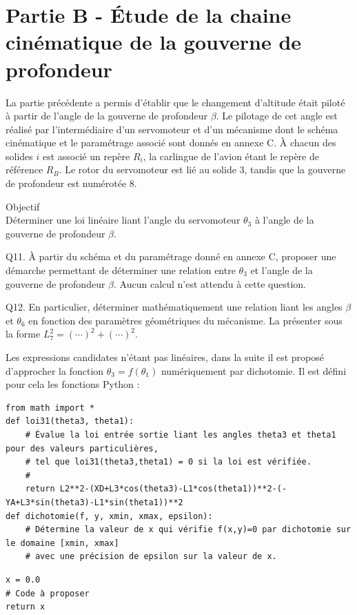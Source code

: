 \documentclass[10pt]{article}
\begin{document}
\section*{Partie B - Étude de la chaine cinématique de la gouverne de profondeur}
La partie précédente a permis d'établir que le changement d'altitude était piloté à partir de l'angle de la gouverne de profondeur $\beta$. Le pilotage de cet angle est réalisé par l'intermédiaire d'un servomoteur et d'un mécanisme dont le schéma cinématique et le paramétrage associé sont donnés en annexe C. À chacun des solides $i$ est associé un repère $R_{i}$, la carlingue de l'avion étant le repère de référence $R_{B}$. Le rotor du servomoteur est lié au solide 3, tandis que la gouverne de profondeur est numérotée 8.

Objectif\\
Déterminer une loi linéaire liant l'angle du servomoteur $\theta_{3}$ à l'angle de la gouverne de profondeur $\beta$.

Q11. À partir du schéma et du paramétrage donné en annexe C, proposer une démarche permettant de déterminer une relation entre $\theta_{3}$ et l'angle de la gouverne de profondeur $\beta$. Aucun calcul n'est attendu à cette question.

Q12. En particulier, déterminer mathématiquement une relation liant les angles $\beta$ et $\theta_{6}$ en fonction des paramètres géométriques du mécanisme. La présenter sous la forme $L_{7}^{2}=(\cdots)^{2}+(\cdots)^{2}$.

Les expressions candidates n'étant pas linéaires, dans la suite il est proposé d'approcher la fonction $\theta_{3}=f\left(\theta_{1}\right)$ numériquement par dichotomie. Il est défini pour cela les fonctions Python :

\begin{verbatim}
from math import *
def loi31(theta3, theta1):
    # Évalue la loi entrée sortie liant les angles theta3 et theta1 pour des valeurs particulières,
    # tel que loi31(theta3,theta1) = 0 si la loi est vérifiée.
    #
    return L2**2-(XD+L3*cos(theta3)-L1*cos(theta1))**2-(-YA+L3*sin(theta3)-L1*sin(theta1))**2
def dichotomie(f, y, xmin, xmax, epsilon):
    # Détermine la valeur de x qui vérifie f(x,y)=0 par dichotomie sur le domaine [xmin, xmax]
    # avec une précision de epsilon sur la valeur de x.
\end{verbatim}

\begin{verbatim}
x = 0.0
# Code à proposer
return x
\end{verbatim}
\end{document}
